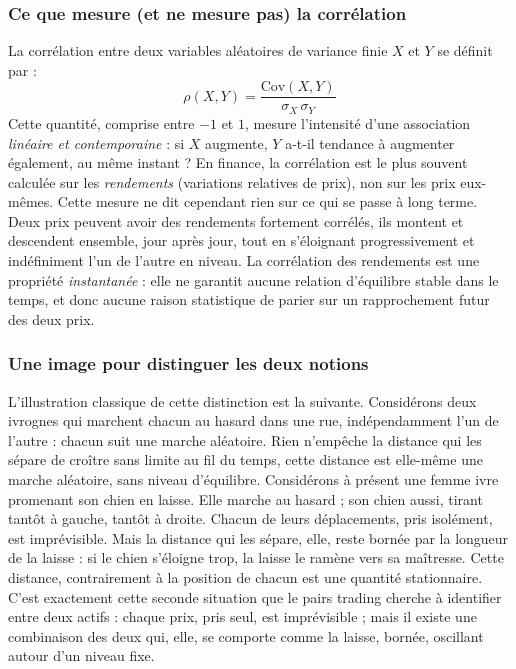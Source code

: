 \documentclass{article}
\begin{document}
\subsubsection*{Ce que mesure (et ne mesure pas) la corrélation}
La corrélation entre deux variables aléatoires de variance finie $X$ et $Y$ se définit par :
\begin{equation}
\rho(X,Y) = \frac{\text{Cov}(X,Y)}{\sigma_X \, \sigma_Y}
\end{equation}
Cette quantité, comprise entre $-1$ et $1$, mesure l'intensité d'une association \emph{linéaire et contemporaine} : si $X$ augmente, $Y$ a-t-il tendance à augmenter également, au même instant ? En finance, la corrélation est le plus souvent calculée sur les \emph{rendements} (variations relatives de prix), non sur les prix eux-mêmes.
Cette mesure ne dit cependant rien sur ce qui se passe à long terme. Deux prix peuvent avoir des rendements fortement corrélés, ils montent et descendent ensemble, jour après jour, tout en s'éloignant progressivement et indéfiniment l'un de l'autre en niveau. La corrélation des rendements est une propriété \emph{instantanée} : elle ne garantit aucune relation d'équilibre stable dans le temps, et donc aucune raison statistique de parier sur un rapprochement futur des deux prix.
\subsubsection*{Une image pour distinguer les deux notions}
L'illustration classique de cette distinction est la suivante. Considérons deux ivrognes qui marchent chacun au hasard dans une rue, indépendamment l'un de l'autre : chacun suit une marche aléatoire. Rien n'empêche la distance qui les sépare de croître sans limite au fil du temps, cette distance est elle-même une marche aléatoire, sans niveau d'équilibre.
Considérons à présent une femme ivre promenant son chien en laisse. Elle marche au hasard ; son chien aussi, tirant tantôt à gauche, tantôt à droite. Chacun de leurs déplacements, pris isolément, est imprévisible. Mais la distance qui les sépare, elle, reste bornée par la longueur de la laisse : si le chien s'éloigne trop, la laisse le ramène vers sa maîtresse. Cette distance, contrairement à la position de chacun est une quantité stationnaire.
C'est exactement cette seconde situation que le pairs trading cherche à identifier entre deux actifs : chaque prix, pris seul, est imprévisible ; mais il existe une combinaison des deux qui, elle, se comporte comme la laisse, bornée, oscillant autour d'un niveau fixe.
\end{document}
